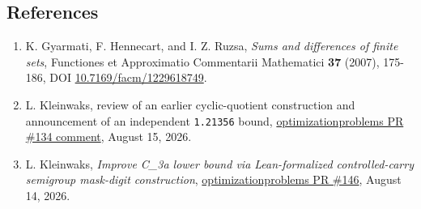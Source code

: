 \documentclass[
  10pt,
]{article}
\providecommand{\tightlist}{%
  \setlength{\itemsep}{0pt}\setlength{\parskip}{0pt}}
\begin{document}
\subsection{References}\label{references}

\begin{enumerate}
\def\labelenumi{\arabic{enumi}.}
\tightlist
\item
  K. Gyarmati, F. Hennecart, and I. Z. Ruzsa, \emph{Sums and differences
  of finite sets}, Functiones et Approximatio Commentarii Mathematici
  \textbf{37} (2007), 175-186, DOI
  \href{https://doi.org/10.7169/facm/1229618749}{10.7169/facm/1229618749}.
\item
  L. Kleinwaks, review of an earlier cyclic-quotient construction and
  announcement of an independent \texttt{1.21356} bound,
  \href{https://github.com/teorth/optimizationproblems/pull/134\#issuecomment-5299513691}{optimizationproblems
  PR \#134 comment}, August 15, 2026.
\item
  L. Kleinwaks, \emph{Improve C\_3a lower bound via Lean-formalized
  controlled-carry semigroup mask-digit construction},
  \href{https://github.com/teorth/optimizationproblems/pull/146}{optimizationproblems
  PR \#146}, August 14, 2026.
\end{enumerate}
\end{document}
